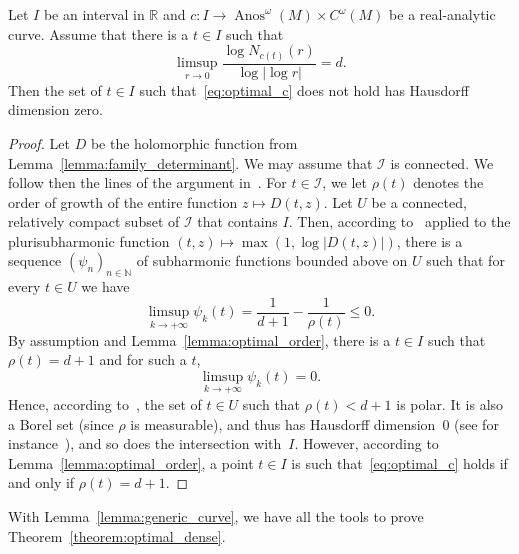 \documentclass[AHL,Unicode,longabstracts,published]{cedram}
\DeclareMathOperator{\Anos}{Anos}
\newcommand{\clI}{\mathcal{I}}
\newcommand{\bbN}{\mathbb{N}}
\newcommand{\bbR}{\mathbb{R}}
\begin{document}
\begin{lemm}\label{lemma:generic_curve}
Let $I$ be an interval in $\bbR$ and $c : I \to \Anos^\omega(M) \times C^\omega(M)$ be a real-analytic curve. Assume that there is a $t \in I$ such that
\begin{equation}\label{eq:optimal_c}
\limsup_{r \to 0} \frac{\log N_{c(t)}(r)}{\log |\log r|} = d.
\end{equation}
Then the set of $t \in I$ such that~\eqref{eq:optimal_c} does not hold has Hausdorff dimension zero.
\end{lemm}

\begin{proof}
Let $D$ be the holomorphic function from Lemma~\ref{lemma:family_determinant}. We may assume that $\clI $ is connected. We follow then the lines of the argument in~\cite[p.~309]{bandtlow_naud}. For $t \in \clI $, we let $\rho(t)$ denotes the order of growth of the entire function $z \mapsto D(t,z)$. Let $U$ be a connected, relatively compact subset of $\clI $ that contains $I$. Then, according to~\cite[Proposition~1.40]{book_lelong_gruman} applied to the plurisubharmonic function $(t,z) \mapsto \max(1,\log |D(t,z)|)$, there is a sequence $(\psi_n)_{n \in \bbN}$ of subharmonic functions bounded above on $U$ such that for every $t \in U$ we have
\begin{equation*}
\limsup_{k \to +\infty} \psi_k(t)= \frac{1}{d+1} - \frac{1}{\rho(t)} \leq 0.
\end{equation*}
By assumption and Lemma~\ref{lemma:optimal_order}, there is a $t \in I$ such that $\rho(t) = d+1$ and for such a $t$,
\begin{equation*}
\limsup_{k \to +\infty} \psi_k(t)= 0.
\end{equation*}
Hence, according to~\cite[Proposition~1.39]{book_lelong_gruman}, the set of $t \in U$ such that $\rho(t) < d+1$ is polar. It is also a Borel set (since $\rho$ is measurable), and thus has Hausdorff dimension~$0$ (see for instance~\cite[Theorems~5.10 and 5.13]{hayman_kennedy_book}), and so does the intersection with~$I$. However, according to Lemma~\ref{lemma:optimal_order}, a point $t \in I$ is such that~\eqref{eq:optimal_c} holds if and only if $\rho(t) = d+1$.
\end{proof}

With Lemma~\ref{lemma:generic_curve}, we have all the tools to prove Theorem~\ref{theorem:optimal_dense}.
\end{document}
